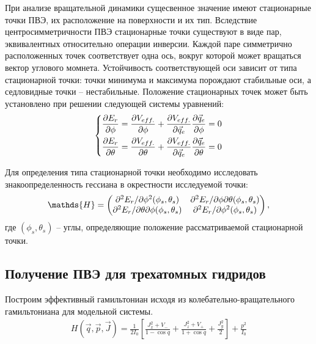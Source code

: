 При анализе вращательной динамики сущесвенное значение имеют стационарные точки ПВЭ, их расположение на поверхности и их тип. Вследствие центросимметричности ПВЭ стационарные точки существуют в виде пар, эквивалентных относительно операции инверсии. Каждой паре симметрично расположенных точек соответствует одна ось, вокруг которой может вращаться вектор углового момнета. Устойчивость соответствующей оси зависит от типа стационарной точки: точки минимума и максимума порождают стабильные оси, а седловидные точки -- нестабильные. Положение стационарных точек может быть установлено при решении следующей системы уравнений:
\vverh
\begin{gather}
\left\{
\begin{aligned}
\frac{\partial E_r}{\partial \phi} = \frac{\partial V_{eff.}}{\partial \phi} + \frac{\partial V_{eff.}}{\partial \vec{q}_e} \frac{\partial \vec{q}_e}{\partial \phi} = 0 \\
\frac{\partial E_r}{\partial \theta} = \frac{\partial V_{eff.}}{\partial \theta} + \frac{\partial V_{eff.}}{\partial \vec{q}_e} \frac{\partial \vec{q}_e}{\partial \theta} = 0
\end{aligned}
\right. \notag
\end{gather}

Для определения типа стационарной точки необходимо исследовать знакоопределенность гессиана в окрестности исследуемой точки: 
\vverh
\begin{gather}
\mathds{H} = \begin{pmatrix}
\partial^2 E_r / \partial \phi^2 (\phi_s, \theta_s) & \partial^2 E_r / \partial \phi \partial \theta (\phi_s, \theta_s) \\
\partial^2 E_r / \partial \theta \partial \phi (\phi_s, \theta_s) & \partial^2 E_r / \partial \phi^2 (\phi_s, \theta_s)
\end{pmatrix}, \notag
\end{gather}
\vlevo где $(\phi_s, \theta_s)$ -- углы, определяющие положение рассматриваемой стационарной точки.

\subsection{Получение ПВЭ для трехатомных гидридов}

Построим эффективный гамильтониан исходя из колебательно-вращательного гамильтониана для модельной системы. 
\vverh
\begin{gather}
H(\vec{q}, \vec{p}, \vec{J}) = \frac{1}{2I_0} \left[ \frac{J_x^2 + V_{-}}{1-\cos q} + \frac{J_z^2 + V_{+}}{1 + \cos q} + \frac{J_y^2}{2} \right] + \frac{p^2}{I_0} \label{model_ham}
\end{gather}

